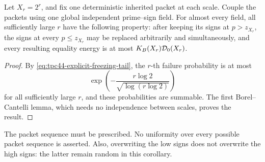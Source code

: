 \begin{corollary}
\label{cor:tpc44-dyadic-overwriting}
Let \(X_r=2^r\), and fix one deterministic inherited packet at each
scale.  Couple the packets using one global independent prime--sign
field.  For almost every field, all sufficiently large \(r\) have the
following property: after keeping its signs at \(p>z_{X_r}\), the signs
at every \(p\le z_{X_r}\) may be replaced arbitrarily and simultaneously,
and every resulting equality energy is at most
\(K_B(X_r)\mathcal D_0(X_r)\).
\end{corollary}

\begin{proof}
By \eqref{eq:tpc44-explicit-freezing-tail}, the \(r\)-th failure
probability is at most
\begin{equation}
 \exp\!\left(
 -\frac{r\log2}{\sqrt{\log(r\log2)}}
 \right)
 \label{eq:tpc44-dyadic-summand}
\end{equation}
for all sufficiently large \(r\), and these probabilities are summable.
The first Borel--Cantelli lemma, which needs no independence between
scales, proves the result.
\end{proof}

The packet sequence must be prescribed.  No uniformity over every
possible packet sequence is asserted.  Also, overwriting the low signs
does not overwrite the high signs: the latter remain random in this
corollary.
